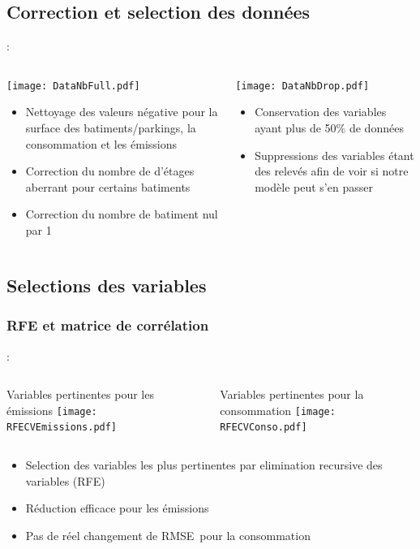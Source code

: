 \documentclass[8pt,aspectratio=169,hyperref={unicode=true}]{beamer}
\begin{document}
\subsection{Correction et selection des données}
\begin{frame}{\insertsection : \insertsubsection}
  \begin{columns}[t]
    \begin{column}{.5\textwidth}
      \texttt{[image: DataNbFull.pdf]}
      \begin{itemize}
        \item Nettoyage des valeurs négative pour la surface des batiments/parkings,
              la consommation et les émissions
        \item Correction du nombre de d'étages aberrant pour certains batiments
        \item Correction du nombre de batiment nul par 1
      \end{itemize}
    \end{column}
    \begin{column}{.5\textwidth}
      \texttt{[image: DataNbDrop.pdf]}
      \begin{itemize}
        \item Conservation des variables ayant plus de 50\% de données
        \item Suppressions des variables étant des relevés afin de voir si notre modèle
              peut s'en passer
      \end{itemize}
    \end{column}
  \end{columns}
\end{frame}

\subsection{Selections des variables}
\subsubsection{RFE et matrice de corrélation}
\begin{frame}{\insertsection : \insertsubsection}{\insertsubsubsection}
  \begin{columns}[t]
    \begin{column}{.5\textwidth}
      \centering
      Variables pertinentes pour les émissions
      \texttt{[image: RFECVEmissions.pdf]}
    \end{column}
    \begin{column}{.5\textwidth}
      \centering
      Variables pertinentes pour la consommation
      \texttt{[image: RFECVConso.pdf]}
    \end{column}
  \end{columns}
  \begin{itemize}
    \item Selection des variables les plus pertinentes par elimination recursive des variables (RFE)
    \item Réduction efficace pour les émissions
    \item Pas de réel changement de RMSE pour la consommation
  \end{itemize}
\end{frame}
\end{document}
